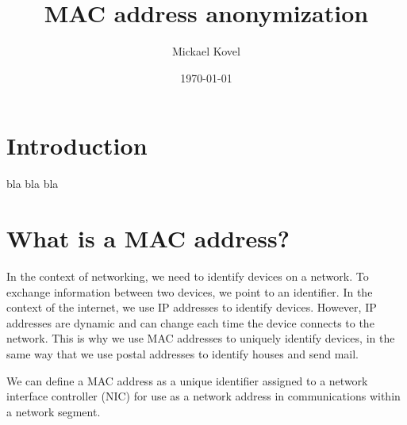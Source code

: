 \documentclass[aps,prb,twocolumn,superscriptaddress,floatfix,longbibliography,nofootinbib]{revtex4-2}
\newcommand{\mytitle}{MAC address anonymization}
\begin{document}

\title{\mytitle}

\author{Mickael Kovel}

\date{\today}

\begin{abstract}


\end{abstract}

\maketitle
\tableofcontents
\section{\label{sec:Intro}Introduction}
bla bla bla

\section{\label{sec:Whatis}What is a MAC address?}
  In the context of networking, we need to identify devices on a network.
  To exchange information between two devices, we point to an identifier.
  In the context of the internet, we use IP addresses to identify devices.
  However, IP addresses are dynamic and can change each time the device connects to the network.
  This is why we use MAC addresses to uniquely identify devices, in the same way 
  that we use postal addresses to identify houses and send mail.

  We can define a MAC address as a unique identifier assigned to a network interface 
  controller (NIC) for use as a network address in communications within a network segment.
\end{document}

